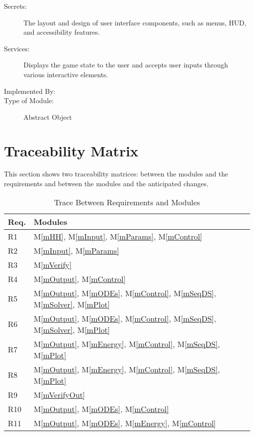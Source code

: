 \documentclass[12pt, titlepage]{article}
\newcommand{\mref}[1]{M\ref{#1}}
\begin{document}
\begin{description}
\item[Secrets:] The layout and design of user interface components, such as menus, HUD, and accessibility features.
\item[Services:] Displays the game state to the user and accepts user inputs through various interactive elements.
\item[Implemented By:] \progname{}
\item[Type of Module:] Abstract Object
\end{description}


\section{Traceability Matrix} \label{SecTM}

This section shows two traceability matrices: between the modules and the
requirements and between the modules and the anticipated changes.

\begin{table}[H]
\centering
\begin{tabular}{p{} p{}}
\toprule
\textbf{Req.} & \textbf{Modules}\\
\midrule
R1 & \mref{mHH}, \mref{mInput}, \mref{mParams}, \mref{mControl}\\
R2 & \mref{mInput}, \mref{mParams}\\
R3 & \mref{mVerify}\\
R4 & \mref{mOutput}, \mref{mControl}\\
R5 & \mref{mOutput}, \mref{mODEs}, \mref{mControl}, \mref{mSeqDS}, \mref{mSolver}, \mref{mPlot}\\
R6 & \mref{mOutput}, \mref{mODEs}, \mref{mControl}, \mref{mSeqDS}, \mref{mSolver}, \mref{mPlot}\\
R7 & \mref{mOutput}, \mref{mEnergy}, \mref{mControl}, \mref{mSeqDS}, \mref{mPlot}\\
R8 & \mref{mOutput}, \mref{mEnergy}, \mref{mControl}, \mref{mSeqDS}, \mref{mPlot}\\
R9 & \mref{mVerifyOut}\\
R10 & \mref{mOutput}, \mref{mODEs}, \mref{mControl}\\
R11 & \mref{mOutput}, \mref{mODEs}, \mref{mEnergy}, \mref{mControl}\\
\bottomrule
\end{tabular}
\caption{Trace Between Requirements and Modules}
\label{TblRT}
\end{table}
\end{document}
